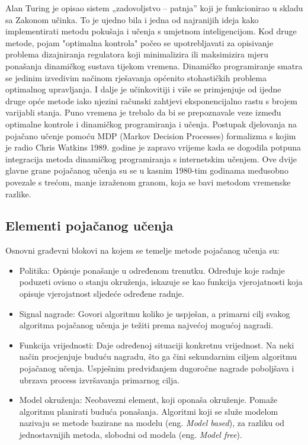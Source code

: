 Alan Turing je opisao sistem „zadovoljstvo – patnja” koji je funkcionirao u skladu sa Zakonom učinka. To je ujedno bila i jedna od najranijih ideja kako implementirati metodu pokušaja i učenja s umjetnom inteligencijom. Kod druge metode, pojam "optimalna kontrola" počeo se upotrebljavati za opisivanje problema dizajniranja regulatora koji minimalizira ili maksimizira mjeru ponašanja dinamičkog sustava tijekom vremena. Dinamičko programiranje smatra se jedinim izvedivim načinom rješavanja općenito stohastičkih problema optimalnog upravljanja. I dalje je učinkovitiji i više se primjenjuje od ijedne druge opće metode iako njezini računski zahtjevi eksponencijalno rastu s brojem varijabli stanja. Puno vremena je trebalo da bi se prepoznavale veze između optimalne kontrole i dinamičkog programiranja i učenja. Postupak djelovanja na pojačano učenje pomoću MDP (Markov Decision Processes) formalizma s kojim je radio Chris Watkins 1989. godine je zapravo vrijeme kada se dogodila potpuna integracija metoda dinamičkog programiranja s internetskim učenjem.
Ove dvije glavne grane pojačanog učenja su se u kasnim 1980-tim godinama međusobno povezale s trećom, manje izraženom granom, koja se bavi metodom vremenske razlike.

\subsection{Elementi pojačanog učenja}
Osnovni građevni blokovi na kojem se temelje metode pojačanog učenja su:
\begin{itemize}
	\item Politika: Opisuje ponašanje u određenom trenutku. Određuje koje radnje poduzeti ovisno o stanju okruženja, iskazuje se kao funkcija vjerojatnosti koja opisuje vjerojatnost sljedeće određene radnje.
	
	\item Signal nagrade: Govori algoritmu koliko je uspješan, a primarni cilj svakog algoritma pojačanog učenja je težiti prema najvećoj mogućoj nagradi. 
	
	\item Funkcija vrijednosti: Daje određenoj situaciji konkretnu vrijednost. Na neki način procjenjuje buduću nagradu, što ga čini sekundarnim ciljem algoritmu pojačanog učenja. Uspješnim predviđanjem dugoročne nagrade poboljšava i ubrzava process izvršavanja primarnog cilja. 
	
	\item Model okruženja: Neobavezni element, koji oponaša okruženje. Pomaže algoritmu planirati buduća ponašanja. Algoritmi koji se služe modelom nazivaju se metode bazirane na modelu (eng. \textit{Model based}), za razliku od jednostavnijih metoda, slobodni od modela (eng. \textit{Model free}).
\end{itemize}

